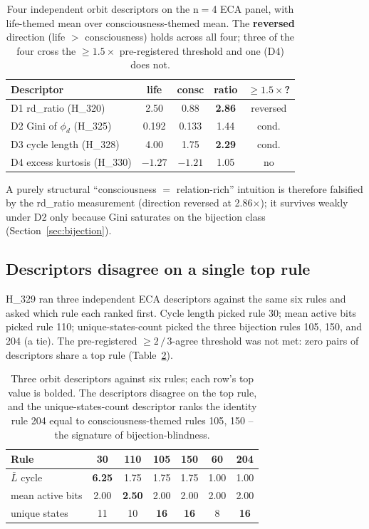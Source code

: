 \documentclass[11pt,a4paper]{article}
\begin{document}
\begin{table}[h]
\centering
\small
\begin{tabular}{lcccc}
\toprule
\textbf{Descriptor} & \textbf{life} & \textbf{consc}
& \textbf{ratio} & \textbf{$\geq 1.5\times$?} \\
\midrule
D1 rd\_ratio        (H\_320) & 2.50  & 0.88  & \textbf{2.86} & reversed \\
D2 Gini of $\phi_d$ (H\_325) & 0.192 & 0.133 & 1.44 & cond. \\
D3 cycle length     (H\_328) & 4.00  & 1.75  & \textbf{2.29} & cond. \\
D4 excess kurtosis  (H\_330) & $-1.27$ & $-1.21$ & 1.05 & no \\
\bottomrule
\end{tabular}
\caption{Four independent orbit descriptors on the n$=$4 ECA panel,
with life-themed mean over consciousness-themed mean. The
\textbf{reversed} direction (life $>$ consciousness) holds across all
four; three of the four cross the $\geq 1.5\times$ pre-registered
threshold and one (D4) does not.}
\label{tab:descriptors}
\end{table}

A purely structural ``consciousness $=$ relation-rich'' intuition is
therefore falsified by the rd\_ratio measurement (direction reversed
at 2.86$\times$); it survives weakly under D2 only because Gini
saturates on the bijection class (Section~\ref{sec:bijection}).

\subsection{Descriptors disagree on a single top rule}
\label{sec:disagree}
H\_329 ran three independent ECA descriptors against the same six
rules and asked which rule each ranked first. Cycle length picked
rule 30; mean active bits picked rule 110; unique-states-count picked
the three bijection rules 105, 150, and 204 (a tie). The pre-registered
$\geq 2\,/\,3$-agree threshold was not met: zero pairs of descriptors
share a top rule (Table~\ref{tab:h329}).

\begin{table}[h]
\centering
\small
\begin{tabular}{lcccccc}
\toprule
\textbf{Rule}         & \textbf{30} & \textbf{110} & \textbf{105}
                      & \textbf{150} & \textbf{60} & \textbf{204} \\
\midrule
$\bar L$ cycle        & \textbf{6.25} & 1.75 & 1.75 & 1.75 & 1.00 & 1.00 \\
mean active bits      & 2.00 & \textbf{2.50} & 2.00 & 2.00 & 2.00 & 2.00 \\
unique states         & 11 & 10 & \textbf{16} & \textbf{16} & 8 & \textbf{16} \\
\bottomrule
\end{tabular}
\caption{Three orbit descriptors against six rules; each row's top
value is bolded. The descriptors disagree on the top rule, and the
unique-states-count descriptor ranks the identity rule \textsc{204}
equal to consciousness-themed rules \textsc{105}, \textsc{150} --
the signature of bijection-blindness.}
\label{tab:h329}
\end{table}
\end{document}
